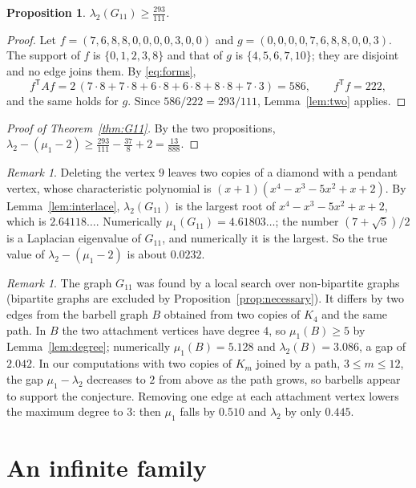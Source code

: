 \documentclass[11pt]{amsart}
\newtheorem{proposition}[theorem]{Proposition}
\theoremstyle{definition}
\theoremstyle{remark}
\newtheorem{remark}[theorem]{Remark}
\newcommand{\tr}{^{\mathsf{T}}}
\begin{document}
\begin{proposition}\label{prop:G11lambda}
$\lambda_2(G_{11})\ge\frac{293}{111}$.
\end{proposition}

\begin{proof}
Let $f=(7,6,8,8,0,0,0,0,3,0,0)$ and $g=(0,0,0,0,7,6,8,8,0,0,3)$. The support of $f$ is
$\{0,1,2,3,8\}$ and that of $g$ is $\{4,5,6,7,10\}$; they are disjoint and no edge joins them.
By \eqref{eq:forms},
\[
f\tr Af=2\,(7\cdot8+7\cdot8+6\cdot8+6\cdot8+8\cdot8+7\cdot3)=586,\qquad f\tr f=222,
\]
and the same holds for $g$. Since $586/222=293/111$, Lemma~\ref{lem:two} applies.
\end{proof}

\begin{proof}[Proof of Theorem~\ref{thm:G11}]
By the two propositions,
$\lambda_2-(\mu_1-2)\ge\frac{293}{111}-\frac{37}{8}+2=\frac{13}{888}$.
\end{proof}

\begin{remark}\label{rem:exact}
Deleting the vertex $9$ leaves two copies of a diamond with a pendant vertex, whose
characteristic polynomial is $(x+1)(x^4-x^3-5x^2+x+2)$. By Lemma~\ref{lem:interlace},
$\lambda_2(G_{11})$ is the largest root of $x^4-x^3-5x^2+x+2$, which is $2.64118\ldots$.
Numerically $\mu_1(G_{11})=4.61803\ldots$; the number $(7+\sqrt5)/2$ is a Laplacian eigenvalue of
$G_{11}$, and numerically it is the largest. So the true value of $\lambda_2-(\mu_1-2)$ is about
$0.0232$.
\end{remark}

\begin{remark}\label{rem:barbell}
The graph $G_{11}$ was found by a local search over non-bipartite graphs (bipartite graphs are
excluded by Proposition~\ref{prop:necessary}). It differs by two edges from the barbell graph
$B$ obtained from two copies of $K_4$ and the same path. In $B$ the two attachment vertices have
degree $4$, so $\mu_1(B)\ge5$ by Lemma~\ref{lem:degree}; numerically $\mu_1(B)=5.128$ and
$\lambda_2(B)=3.086$, a gap of $2.042$. In our computations with two copies of $K_m$ joined by
a path, $3\le m\le12$, the gap $\mu_1-\lambda_2$ decreases to $2$ from above as the path grows,
so barbells appear to support the conjecture. Removing one edge at each attachment vertex
lowers the maximum degree to $3$: then $\mu_1$ falls by $0.510$ and $\lambda_2$ by only $0.445$.
\end{remark}

\section{An infinite family}\label{sec:family}
\end{document}
